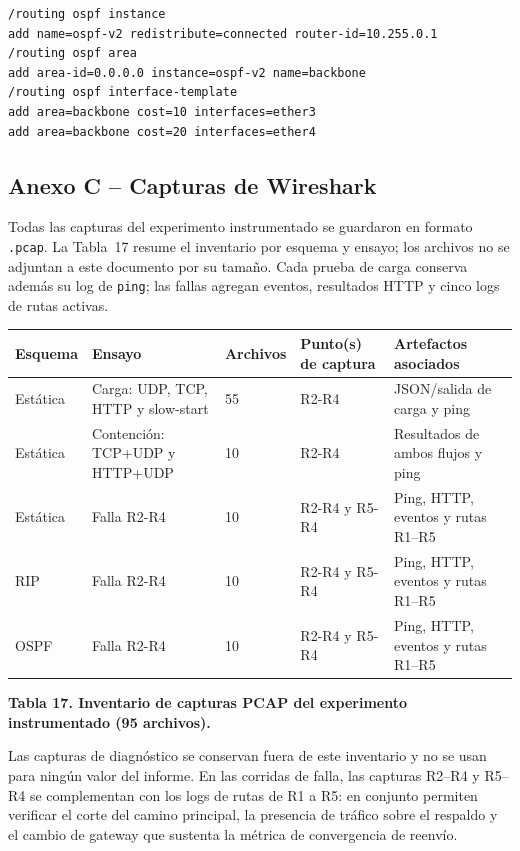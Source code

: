 \documentclass[11pt,a4paper]{article}
\newcommand{\figcaption}[1]{\par\noindent\footnotesize\textbf{#1}\par\vspace{0.4cm}}
\begin{document}
{\scriptsize
\begin{verbatim}
/routing ospf instance
add name=ospf-v2 redistribute=connected router-id=10.255.0.1
/routing ospf area
add area-id=0.0.0.0 instance=ospf-v2 name=backbone
/routing ospf interface-template
add area=backbone cost=10 interfaces=ether3
add area=backbone cost=20 interfaces=ether4
\end{verbatim}
}

\subsection*{Anexo C -- Capturas de Wireshark}

Todas las capturas del experimento instrumentado se guardaron en formato \texttt{.pcap}. La Tabla~17 resume el inventario por esquema y ensayo; los archivos no se adjuntan a este documento por su tama\~no. Cada prueba de carga conserva adem\'as su log de \texttt{ping}; las fallas agregan eventos, resultados HTTP y cinco logs de rutas activas.

\needspace{1cm}
\begin{center}
\begin{minipage}{0.96\linewidth}
\centering
\small
\setlength{\tabcolsep}{4pt}
\begin{tabular}{@{}p{1.7cm}p{4.8cm}p{1.6cm}p{3.1cm}p{2cm}@{}}
\toprule
\textbf{Esquema} & \textbf{Ensayo} & \textbf{Archivos} & \textbf{Punto(s) de captura} & \textbf{Artefactos asociados} \\
\midrule
Est\'atica & Carga: UDP, TCP, HTTP y slow-start & 55 & R2-R4 & JSON/salida de carga y ping \\
Est\'atica & Contenci\'on: TCP+UDP y HTTP+UDP & 10 & R2-R4 & Resultados de ambos flujos y ping \\
Est\'atica & Falla R2-R4 & 10 & R2-R4 y R5-R4 & Ping, HTTP, eventos y rutas R1--R5 \\
RIP & Falla R2-R4 & 10 & R2-R4 y R5-R4 & Ping, HTTP, eventos y rutas R1--R5 \\
OSPF & Falla R2-R4 & 10 & R2-R4 y R5-R4 & Ping, HTTP, eventos y rutas R1--R5 \\
\bottomrule
\end{tabular}
\par\vspace{0.1cm}
\figcaption{Tabla 17. Inventario de capturas PCAP del experimento instrumentado (95 archivos).}
\end{minipage}
\end{center}

Las capturas de diagn\'ostico se conservan fuera de este inventario y no se usan para ning\'un valor del informe. En las corridas de falla, las capturas R2--R4 y R5--R4 se complementan con los logs de rutas de R1 a R5: en conjunto permiten verificar el corte del camino principal, la presencia de tr\'afico sobre el respaldo y el cambio de gateway que sustenta la m\'etrica de convergencia de reenv\'io.
\end{document}

